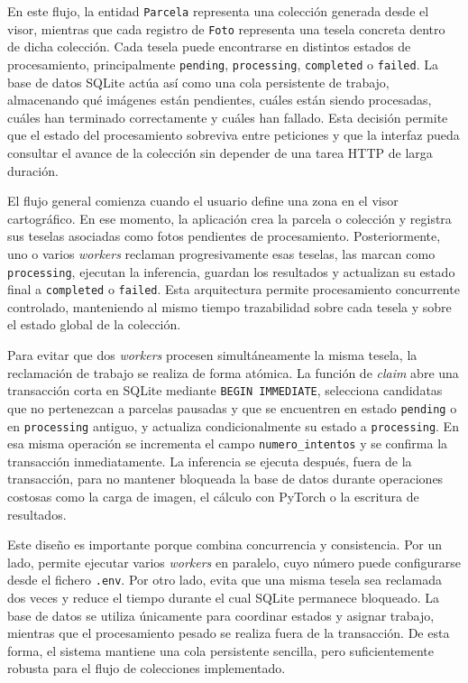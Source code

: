 En este flujo, la entidad \texttt{Parcela} representa una colección generada desde el visor, mientras que cada registro de \texttt{Foto} representa una tesela concreta dentro de dicha colección. Cada tesela puede encontrarse en distintos estados de procesamiento, principalmente \texttt{pending}, \texttt{processing}, \texttt{completed} o \texttt{failed}. La base de datos SQLite actúa así como una cola persistente de trabajo, almacenando qué imágenes están pendientes, cuáles están siendo procesadas, cuáles han terminado correctamente y cuáles han fallado. Esta decisión permite que el estado del procesamiento sobreviva entre peticiones y que la interfaz pueda consultar el avance de la colección sin depender de una tarea HTTP de larga duración.

El flujo general comienza cuando el usuario define una zona en el visor cartográfico. En ese momento, la aplicación crea la parcela o colección y registra sus teselas asociadas como fotos pendientes de procesamiento. Posteriormente, uno o varios \textit{workers} reclaman progresivamente esas teselas, las marcan como \texttt{processing}, ejecutan la inferencia, guardan los resultados y actualizan su estado final a \texttt{completed} o \texttt{failed}. Esta arquitectura permite procesamiento concurrente controlado, manteniendo al mismo tiempo trazabilidad sobre cada tesela y sobre el estado global de la colección.

Para evitar que dos \textit{workers} procesen simultáneamente la misma tesela, la reclamación de trabajo se realiza de forma atómica. La función de \textit{claim} abre una transacción corta en SQLite mediante \texttt{BEGIN IMMEDIATE}, selecciona candidatas que no pertenezcan a parcelas pausadas y que se encuentren en estado \texttt{pending} o en \texttt{processing} antiguo, y actualiza condicionalmente su estado a \texttt{processing}. En esa misma operación se incrementa el campo \texttt{numero\_intentos} y se confirma la transacción inmediatamente. La inferencia se ejecuta después, fuera de la transacción, para no mantener bloqueada la base de datos durante operaciones costosas como la carga de imagen, el cálculo con PyTorch o la escritura de resultados.

Este diseño es importante porque combina concurrencia y consistencia. Por un lado, permite ejecutar varios \textit{workers} en paralelo, cuyo número puede configurarse desde el fichero \texttt{.env}. Por otro lado, evita que una misma tesela sea reclamada dos veces y reduce el tiempo durante el cual SQLite permanece bloqueado. La base de datos se utiliza únicamente para coordinar estados y asignar trabajo, mientras que el procesamiento pesado se realiza fuera de la transacción. De esta forma, el sistema mantiene una cola persistente sencilla, pero suficientemente robusta para el flujo de colecciones implementado.

